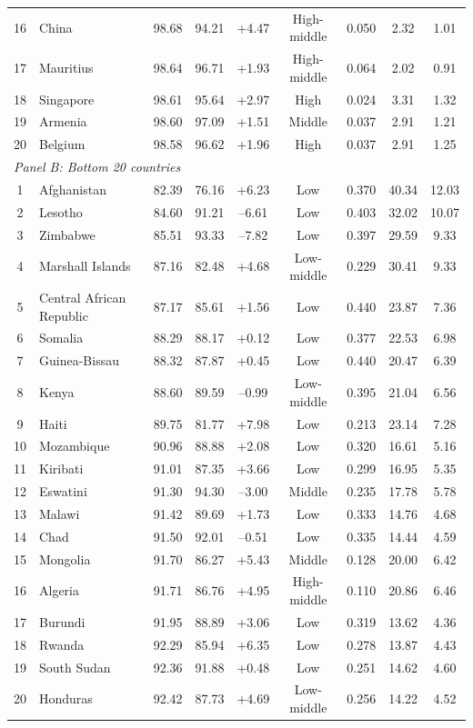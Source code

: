 \documentclass[12pt]{article}
\begin{document}
\begin{longtable}{clccccccc}
16 & China & 98.68 & 94.21 & +4.47 & High-middle & 0.050 & 2.32 & 1.01 \\
17 & Mauritius & 98.64 & 96.71 & +1.93 & High-middle & 0.064 & 2.02 & 0.91 \\
18 & Singapore & 98.61 & 95.64 & +2.97 & High & 0.024 & 3.31 & 1.32 \\
19 & Armenia & 98.60 & 97.09 & +1.51 & Middle & 0.037 & 2.91 & 1.21 \\
20 & Belgium & 98.58 & 96.62 & +1.96 & High & 0.037 & 2.91 & 1.25 \\
\midrule
\multicolumn{9}{l}{\textit{Panel B: Bottom 20 countries}} \\
\midrule
1 & Afghanistan & 82.39 & 76.16 & +6.23 & Low & 0.370 & 40.34 & 12.03 \\
2 & Lesotho & 84.60 & 91.21 & --6.61 & Low & 0.403 & 32.02 & 10.07 \\
3 & Zimbabwe & 85.51 & 93.33 & --7.82 & Low & 0.397 & 29.59 & 9.33 \\
4 & Marshall Islands & 87.16 & 82.48 & +4.68 & Low-middle & 0.229 & 30.41 & 9.33 \\
5 & Central African Republic & 87.17 & 85.61 & +1.56 & Low & 0.440 & 23.87 & 7.36 \\
6 & Somalia & 88.29 & 88.17 & +0.12 & Low & 0.377 & 22.53 & 6.98 \\
7 & Guinea-Bissau & 88.32 & 87.87 & +0.45 & Low & 0.440 & 20.47 & 6.39 \\
8 & Kenya & 88.60 & 89.59 & --0.99 & Low-middle & 0.395 & 21.04 & 6.56 \\
9 & Haiti & 89.75 & 81.77 & +7.98 & Low & 0.213 & 23.14 & 7.28 \\
10 & Mozambique & 90.96 & 88.88 & +2.08 & Low & 0.320 & 16.61 & 5.16 \\
11 & Kiribati & 91.01 & 87.35 & +3.66 & Low & 0.299 & 16.95 & 5.35 \\
12 & Eswatini & 91.30 & 94.30 & --3.00 & Middle & 0.235 & 17.78 & 5.78 \\
13 & Malawi & 91.42 & 89.69 & +1.73 & Low & 0.333 & 14.76 & 4.68 \\
14 & Chad & 91.50 & 92.01 & --0.51 & Low & 0.335 & 14.44 & 4.59 \\
15 & Mongolia & 91.70 & 86.27 & +5.43 & Middle & 0.128 & 20.00 & 6.42 \\
16 & Algeria & 91.71 & 86.76 & +4.95 & High-middle & 0.110 & 20.86 & 6.46 \\
17 & Burundi & 91.95 & 88.89 & +3.06 & Low & 0.319 & 13.62 & 4.36 \\
18 & Rwanda & 92.29 & 85.94 & +6.35 & Low & 0.278 & 13.87 & 4.43 \\
19 & South Sudan & 92.36 & 91.88 & +0.48 & Low & 0.251 & 14.62 & 4.60 \\
20 & Honduras & 92.42 & 87.73 & +4.69 & Low-middle & 0.256 & 14.22 & 4.52 \\
\end{longtable}
\end{document}
